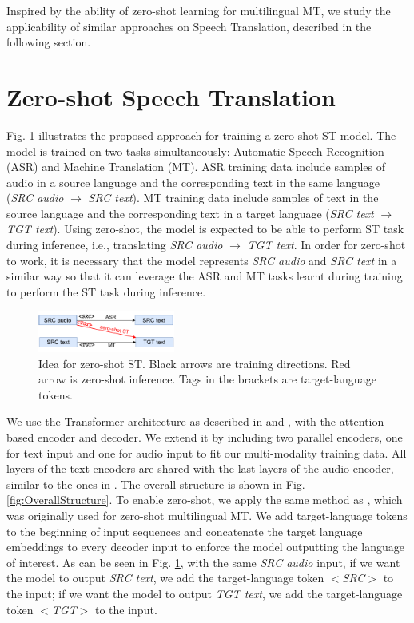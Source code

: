 \documentclass[conference]{IEEEtran}
\begin{document}
	Inspired by the ability of zero-shot learning for multilingual MT, we study the applicability of similar approaches on Speech Translation, described in the following section. 
	
	\section{Zero-shot Speech Translation} \label{sec:zsST}
	Fig. \ref{fig:baseZS} illustrates the proposed approach for training a zero-shot ST model. The model is trained on two tasks simultaneously: Automatic Speech Recognition (ASR) and Machine Translation (MT). ASR training data include samples of audio in a source language and the corresponding text in the same language (\textit{SRC audio} $\rightarrow$ \textit{SRC text}). MT training data include samples of text in the source language and the corresponding text in a target language (\textit{SRC text} $\rightarrow$ \textit{TGT text}). Using zero-shot, the model is expected to be able to perform  ST task during inference, i.e., translating \textit{SRC audio} $\rightarrow$ \textit{TGT text}. In order for zero-shot to work, it is necessary that the model represents \textit{SRC audio} and \textit{SRC text} in a similar way so that it can leverage the ASR and MT tasks learnt during training to perform the ST task during inference.
	
	\begin{figure}[htbp]
		\centerline{\includegraphics[width=0.4\textwidth]{charts/ZeroshotST.pdf}}
		\caption{Idea for zero-shot ST. Black arrows are training directions. Red arrow is zero-shot inference. Tags in the brackets are target-language tokens.}
		\label{fig:baseZS}
	\end{figure}
	
	We use the Transformer architecture as described in \cite{attention} and \cite{quan-2019-very-deep}, with the attention-based encoder and decoder. We extend it by including two parallel encoders, one for text input and one for audio input to fit our multi-modality training data. All layers of the text encoders are shared with the last layers of the audio encoder, similar to the ones in \cite{tang2021general}. The overall structure is shown in Fig. \ref{fig:OverallStructure}. To enable zero-shot, we apply the same method as \cite{ZS-Quan}, which was originally used for zero-shot multilingual MT. We add target-language tokens to the beginning of input sequences and concatenate the target language embeddings to every decoder input to enforce the model outputting the language of interest. As can be seen in Fig. \ref{fig:baseZS}, with the same \textit{SRC audio} input, if we want the model to output \textit{SRC text}, we add the target-language token \textit{$<$SRC$>$} to the input; if we want the model to output \textit{TGT text}, we add the target-language token \textit{$<$TGT$>$} to the input. 
	
\end{document}
